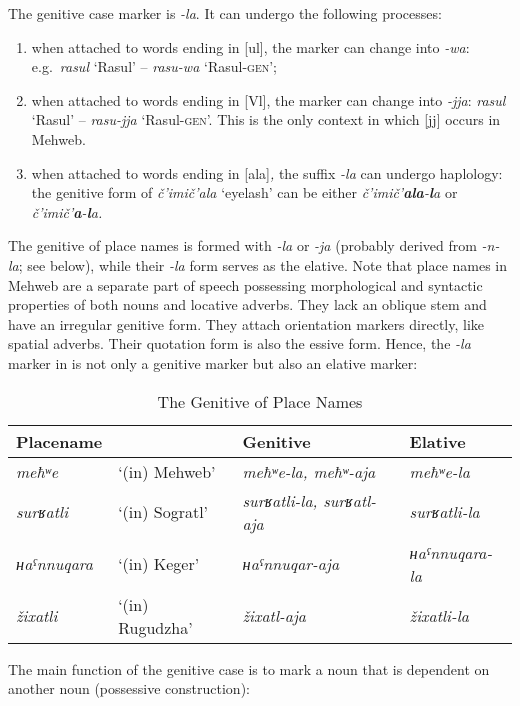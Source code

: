 ﻿\documentclass[output=paper]{langsci/langscibook}
\begin{document}
The genitive case marker is \emph{-la}. It can undergo the following
processes:
\begin{enumerate}[topsep=\medskipamount,itemsep=0pt,partopsep=0pt,parsep=0pt,label={\arabic*})]
\item %
  when attached to words ending in [ul], the marker can change into
\emph{-wa}: e.g.\ \emph{rasul} `Rasul' – \emph{rasu-wa}
`Rasul-\textsc{gen}';

\item %
  when attached to words ending in [Vl], the marker can change into
\emph{-jja}: \emph{rasul} `Rasul' – \emph{rasu-jja}
`Rasul-\textsc{gen}'. This is the only context in which [jj] occurs in
Mehweb.

\item %
  when attached to words ending in [ala]\emph{,} the suffix
\emph{-la} can undergo haplology: the genitive form of \emph{č'imič'ala}
`eyelash' can be either \emph{č'imič'\textbf{ala}-\textbf{l}a} or
\emph{č'imič'\textbf{a}-\textbf{l}a.}
\end{enumerate}

{The genitive of place names is formed with \emph{-la} or \emph{-ja}
(probably derived from \emph{-n-la}; see below), while their \emph{-la}
form serves as the elative. Note that place names in Mehweb are a separate
part of speech possessing morphological and syntactic properties of both
nouns and locative adverbs. They lack an oblique stem and have an irregular
genitive form. They attach orientation markers directly, like spatial
adverbs. Their quotation form is also the essive form. Hence, the
\emph{-la} marker in  is not only a genitive marker but also an elative
marker:}

\begin{table}[h]
  \caption{The Genitive of Place Names}\label{tab:3:37}
\begin{tabular}{@{}llll@{}}
\toprule
{Placename} &  & {Genitive} & {Elative}\tabularnewline \midrule
\emph{meħʷe} & `(in) Mehweb' & \emph{meħʷe-la, meħʷ-aja} &
\emph{meħʷe-la}\tabularnewline
\emph{surʁatli} & `(in) Sogratl' & \emph{surʁatli-la, surʁatl-aja} &
\emph{surʁatli-la}\tabularnewline
\emph{ʜaˤnnuqara} & `(in) Keger' & \emph{ʜaˤnnuqar-aja} &
\emph{ʜaˤnnuqara-la}\tabularnewline
\emph{žixatli} & `(in) Rugudzha' & \emph{žixatl-aja} &
\emph{žixatli-la}\tabularnewline
\bottomrule
\end{tabular}
\end{table}

The main function of the genitive case is to mark a noun that is
dependent on another noun (possessive construction):
\end{document}
